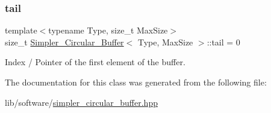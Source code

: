 \subsubsection{\texorpdfstring{tail}{tail}}
{\footnotesize\ttfamily template$<$typename Type, size\+\_\+t Max\+Size$>$ \\
size\+\_\+t \hyperlink{classSimpler__Circular__Buffer}{Simpler\+\_\+\+Circular\+\_\+\+Buffer}$<$ Type, Max\+Size $>$\+::tail = 0\hspace{0.3cm}{\ttfamily [private]}}



Index / Pointer of the first element of the buffer. 



The documentation for this class was generated from the following file\+:\begin{DoxyCompactItemize}
\item 
lib/software/\hyperlink{simpler__circular__buffer_8hpp}{simpler\+\_\+circular\+\_\+buffer.\+hpp}\end{DoxyCompactItemize}
